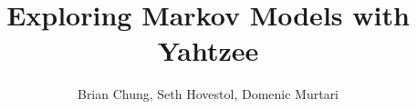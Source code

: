 \documentclass[12pt]{article}
\begin{document}
\title{Exploring Markov Models with Yahtzee}
\author{Brian Chung, Seth Hovestol, Domenic Murtari}
\maketitle









\end{document}
